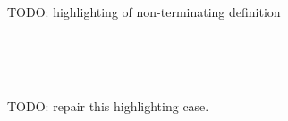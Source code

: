 \documentclass{article}
\begin{document}
\begin{code}%
\>[0]\AgdaSpace{}%
\AgdaSpace{}%
\AgdaSymbol{(}\AgdaSpace{}%
\AgdaSymbol{:}\AgdaSpace{}%
\AgdaSymbol{)}\AgdaSpace{}%
\AgdaSymbol{:}\AgdaSpace{}%
\AgdaSpace{}%
\<%
\\
\>[0][@{}l@{\AgdaIndent{0}}]%
\>[2]\AgdaSpace{}%
\<%
\\
%
\\[\AgdaEmptyExtraSkip]%
%
\>[2]\AgdaSpace{}%
\AgdaSpace{}%
\AgdaSymbol{:}\AgdaSpace{}%
\<%
\\
%
\\[\AgdaEmptyExtraSkip]%
%
\>[2]\AgdaSpace{}%
\AgdaSymbol{:}\AgdaSpace{}%
\AgdaSpace{}%
\AgdaSpace{}%
\AgdaSpace{}%
\AgdaSpace{}%
\<%
\\
%
\>[2]\AgdaSpace{}%
\AgdaSpace{}%
\AgdaSpace{}%
\AgdaSymbol{=}\AgdaSpace{}%
\<%
\\
%
\\[\AgdaEmptyExtraSkip]%
%
\>[2]\AgdaSpace{}%
\AgdaSpace{}%
\AgdaSymbol{:}\AgdaSpace{}%
\AgdaSpace{}%
\AgdaSpace{}%
\AgdaSpace{}%
\AgdaSpace{}%
\<%
\end{code}

TODO: highlighting of non-terminating definition

\begin{code}%
%
\>[2]\<%
\\
%
\>[2]\<%
\\
%
\\[\AgdaEmptyExtraSkip]%
\>[0]\AgdaSpace{}%
\AgdaSpace{}%
\AgdaSymbol{:}\AgdaSpace{}%
\AgdaSymbol{\AgdaUnderscore{}}\<%
\end{code}

TODO: repair this highlighting case.
\end{document}

